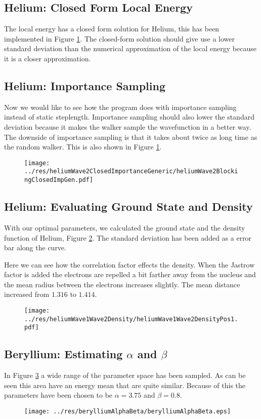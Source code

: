 \documentclass[twocolumn]{article}[10pt]
\begin{document}
\subsection{Helium: Closed Form Local Energy}
The local energy has a closed form solution for Helium, this has 
been implemented in Figure \ref{fig:3}. The closed-form solution should
give use a lower standard deviation than the numerical approximation
of the local energy because it is a closer approximation. 

\subsection{Helium: Importance Sampling}
Now we would like to see how the program does with importance sampling instead 
of static steplength. Importance sampling should also lower the standard 
deviation because it makes the walker sample the wavefunction in a
better way. The downside of importance sampling is that it takes about
twice as long time as the random walker. This is also shown in Figure \ref{fig:3}. 

\begin{figure}[h!]
	\centering
	\texttt{[image: ../res/heliumWave2ClosedImportanceGeneric/heliumWave2BlockingClosedImpGen.pdf]}
	\caption{}\label{fig:3}
\end{figure}

\subsection{Helium: Evaluating Ground State and Density}
With our optimal parameters, we calculated the ground state and the density
function of Helium, Figure \ref{fig:4}. The standard deviation has been added as
a error bar along the curve.

Here we can see how the correlation factor effects the density. When
the Jastrow factor is added the electrons are repelled a bit farther 
away from the nucleus and the mean radius between the electrons increases
slightly. The mean distance increased from $1.316$ to $1.414$. 
\begin{figure}[h!]
	\centering
	\texttt{[image: ../res/heliumWave1Wave2Density/heliumWave1Wave2DensityPos1.pdf]}
	\caption{}\label{fig:4}
\end{figure}

\subsection{Beryllium: Estimating $\alpha$ and $\beta$}
In Figure \ref{fig:5} a wide range of the parameter space has been sampled. As can be seen this area have an energy mean that are quite similar. Because of this
the parameters have been chosen to be $\alpha =  3.75$ and $\beta = 0.8$. 
\begin{figure}[h!]
	\centering
	\texttt{[image: ../res/berylliumAlphaBeta/berylliumAlphaBeta.eps]}
	\caption{}\label{fig:5}
\end{figure}
\end{document}
